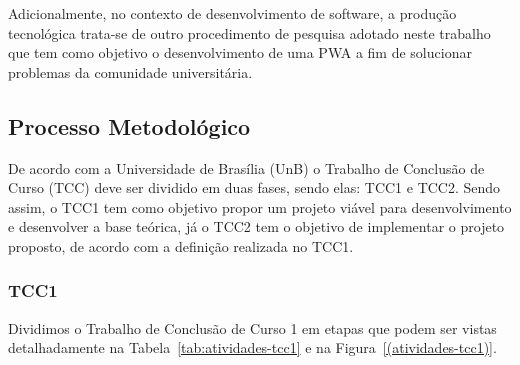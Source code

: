 Adicionalmente, no contexto de desenvolvimento de software, a produção tecnológica trata-se de outro procedimento de pesquisa adotado neste trabalho que tem como objetivo o desenvolvimento de uma PWA a fim de solucionar problemas da comunidade universitária.

\subsection{Processo Metodológico}

De acordo com a Universidade de Brasília (UnB) o Trabalho de Conclusão de Curso (TCC) deve ser dividido em duas fases, sendo elas: TCC1 e TCC2. Sendo assim, o TCC1 tem como objetivo propor um projeto viável para desenvolvimento e desenvolver a base teórica, já o TCC2 tem o objetivo de implementar o projeto proposto, de acordo com a definição realizada no TCC1.

\subsubsection{TCC1}

Dividimos o Trabalho de Conclusão de Curso 1 em etapas que podem ser vistas detalhadamente na Tabela~\ref{tab:atividades-tcc1} e na Figura~\ref{(atividades-tcc1)}.


